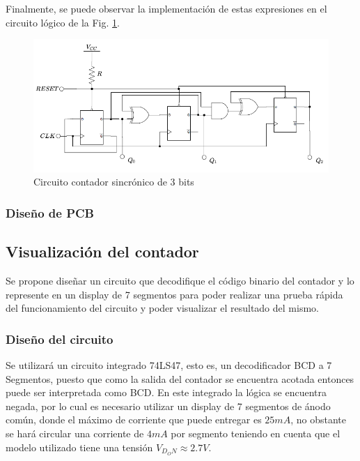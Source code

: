 Finalmente, se puede observar la implementaci\'on de estas expresiones en el circuito l\'ogico de la Fig. \ref{fig:contador_sincronico_circuito}.

\begin{figure}[H]
    \centering
        \includegraphics[scale=0.65]{../EJ7/Recursos/contador_sincronico.png}
    \caption{Circuito contador sincr\'onico de 3 bits}
    \label{fig:contador_sincronico_circuito}
\end{figure}

\subsubsection{Dise\~no de PCB}

\subsection{Visualizaci\'on del contador}
Se propone dise\~nar un circuito que decodifique el c\'odigo binario del contador y lo represente en un display
de 7 segmentos para poder realizar una prueba r\'apida del funcionamiento del circuito y poder visualizar el resultado del mismo.

\subsubsection{Dise\~no del circuito}
Se utilizar\'a un circuito integrado 74LS47, esto es, un decodificador BCD a 7 Segmentos, puesto que como la salida del contador se encuentra acotada
entonces puede ser interpretada como BCD. En este integrado la l\'ogica se encuentra negada, por lo cual es necesario utilizar un display de 7 segmentos de \'anodo com\'un,
donde el m\'aximo de corriente que puede entregar es $25mA$, no obstante se har\'a circular una corriente de $4mA$ por segmento teniendo en cuenta que el modelo utilizado tiene una
tensi\'on $V_{D_ON} \approx 2.7V$.

